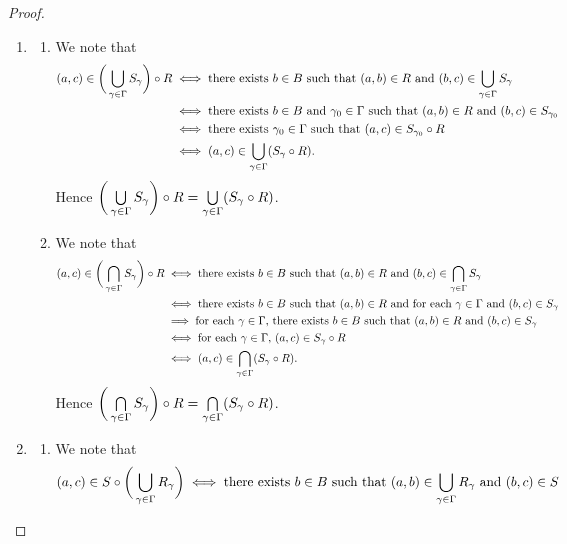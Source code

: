 \begin{proof}\
	\begin{enumerate}
		\item 
		\begin{enumerate}
			\item We note that
			\begin{align*}
				(a,c) \in \bigg( \bigcup\limits_{\gamma \in \Gamma} S_{\gamma} \bigg) \circ R 
				& \iff \text{there exists $b \in B$ such that $(a,b) \in R$ and $(b,c) \in \bigcup\limits_{\gamma \in \Gamma} S_{\gamma} $} \\
				& \iff \text{there exists $b \in B$ and $\gamma_0 \in \Gamma$ such that $(a,b) \in R$ and $(b,c) \in S_{\gamma_0}$} \\
				& \iff \text{there exists $\gamma_0 \in \Gamma$ such that $(a, c) \in S_{\gamma_0} \circ R$} \\
				& \iff (a, c) \in \bigcup\limits_{\gamma \in \Gamma} (S_{\gamma} \circ R).
			\end{align*}
			Hence $\bigg( \bigcup\limits_{\gamma \in \Gamma} S_{\gamma} \bigg) \circ R  = \bigcup\limits_{\gamma \in \Gamma} (S_{\gamma} \circ R)$.
			\item 
			We note that
			\begin{align*}
				(a,c) \in \bigg( \bigcap\limits_{\gamma \in \Gamma} S_{\gamma} \bigg) \circ R 
				& \iff \text{there exists $b \in B$ such that $(a,b) \in R$ and $(b,c) \in \bigcap\limits_{\gamma \in \Gamma} S_{\gamma} $} \\
				& \iff \text{there exists $b \in B$ such that $(a,b) \in R$ and for each $\gamma \in \Gamma$ and $(b,c) \in S_{\gamma}$} \\
				& \implies \text{for each $\gamma \in \Gamma$, there exists $b \in B$ such that $(a, b) \in R$ and $(b,c) \in S_{\gamma}$} \\
				& \iff \text{for each $\gamma \in \Gamma$, $(a,c) \in S_{\gamma} \circ R$} \\
				& \iff (a, c) \in \bigcap\limits_{\gamma \in \Gamma} (S_{\gamma} \circ R).
			\end{align*}
			Hence $\bigg( \bigcap\limits_{\gamma \in \Gamma} S_{\gamma} \bigg) \circ R  = \bigcap\limits_{\gamma \in \Gamma} (S_{\gamma} \circ R)$.
			\end{enumerate}
		\item 
		\begin{enumerate}
			\item We note that  
			\begin{align*}
				(a,c) \in S \circ \bigg( \bigcup\limits_{\gam \in \Gam} R_{\gam} \bigg)
				& \iff \text{there exists $b \in B$ such that $(a,b) \in \bigcup\limits_{\gam \in \Gam} R_{\gam}$ and $(b,c) \in S$} \\

\end{align*}
\end{enumerate}
\end{enumerate}
\end{proof}
